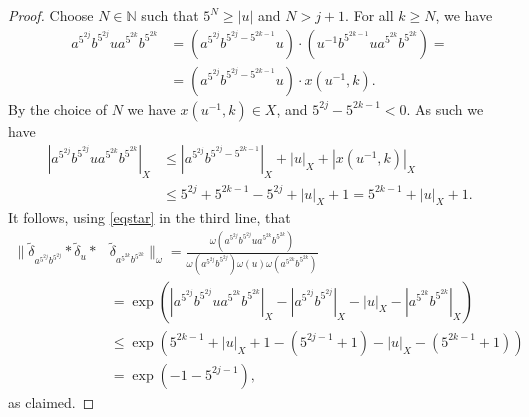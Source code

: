 \documentclass[twoside,11pt]{amsart}
\numberwithin{equation}{section}
\newtheorem{corollary}[theorem]{Corollary}
\theoremstyle{definition}
\newcommand {\N}{\mathbb N}
\newcommand{\eps}{\varepsilon}
\newcommand{\1}{\mathbbm{1}}
\newcommand{\F}{\mathbb F}
\begin{document}
	\begin{proof}
		Choose $N \in \N$ such that $5^N \geq |u|$ and $N > j+1$.
		For all $k \geq N$, we have
		\begin{align*}
			a^{5^{2j}}b^{5^{2j}} u a^{5^{2k}} b^{5^{2k}} &= 
			(a^{5^{2j}} b^{5^{2j} - 5^{2k-1}} u) \cdot
			(u^{-1} b^{5^{2k-1}} u a^{5^{2k}}b^{5^{2k}}) = \\
			&= (a^{5^{2j}} b^{5^{2j} - 5^{2k-1}} u) \cdot x(u^{-1}, k).
		\end{align*}
		By the choice of $N$ we have $x(u^{-1}, k) \in X$, and $5^{2j} - 5^{2k-1} <0$. As such we have
		\begin{align*}
			|a^{5^{2j}}b^{5^{2j}} u a^{5^{2k}} b^{5^{2k}} |_X 
			&\leq |a^{5^{2j}}b^{5^{2j} - 5^{2k-1}}|_X + |u|_X +|x(u^{-1}, k)|_X \\
			&\leq 5^{2j} + 5^{2k-1} - 5^{2j} + |u|_X + 1 = 5^{2k-1} + |u|_X +1.
		\end{align*}
		It follows, using \eqref{eqstar} in the third line, that 
		\begin{align*}
			\| \widetilde{\delta}_{a^{5^{2j}} b^{5^{2j}}} * \widetilde{\delta}_u * &\widetilde{\delta}_{a^{5^{2k}} b^{5^{2k}}} \|_\omega  = \frac{\omega(a^{5^{2j}}b^{5^{2j}} u a^{5^{2k}} b^{5^{2k}})}{\omega(a^{5^{2j}}b^{5^{2j}}) \omega(u) \omega(a^{5^{2k}} b^{5^{2k}})} \\
			&= \exp \left(| a^{5^{2j}}b^{5^{2j}} u a^{5^{2k}} b^{5^{2k}}|_X - 
			| a^{5^{2j}}b^{5^{2j}}|_X - |u|_X - |a^{5^{2k}} b^{5^{2k}}|_X \right) \\
			&\leq \exp \left( 5^{2k-1} + |u|_X + 1 - (5^{2j-1} + 1) 
			-|u|_X - ( 5^{2k-1}+1) \right) \\
			&= \exp(-1 - 5^{2j-1}),
		\end{align*}
		as claimed.
	\end{proof}
	
	
	
\end{document}

